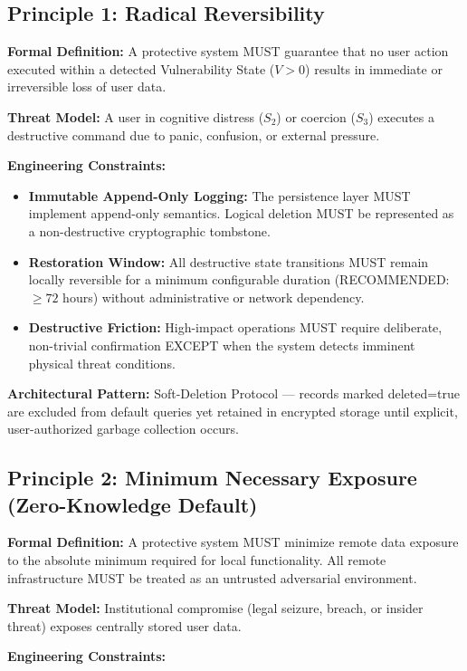\documentclass[acmsmall,review]{acmart}
\begin{document}
\subsection{Principle 1: Radical Reversibility}

\textbf{Formal Definition:} A protective system MUST guarantee that no user action executed within a detected Vulnerability State ($V > 0$) results in immediate or irreversible loss of user data.

\textbf{Threat Model:} A user in cognitive distress ($S_2$) or coercion ($S_3$) executes a destructive command due to panic, confusion, or external pressure.

\textbf{Engineering Constraints:}

\begin{itemize}
    \item \textbf{Immutable Append-Only Logging:} The persistence layer MUST implement append-only semantics. Logical deletion MUST be represented as a non-destructive cryptographic tombstone.
    \item \textbf{Restoration Window:} All destructive state transitions MUST remain locally reversible for a minimum configurable duration (RECOMMENDED: $\ge 72$ hours) without administrative or network dependency.
    \item \textbf{Destructive Friction:} High-impact operations MUST require deliberate, non-trivial confirmation EXCEPT when the system detects imminent physical threat conditions.
\end{itemize}

\textbf{Architectural Pattern:} Soft-Deletion Protocol --- records marked deleted=true are excluded from default queries yet retained in encrypted storage until explicit, user-authorized garbage collection occurs.

\subsection{Principle 2: Minimum Necessary Exposure (Zero-Knowledge Default)}

\textbf{Formal Definition:} A protective system MUST minimize remote data exposure to the absolute minimum required for local functionality. All remote infrastructure MUST be treated as an untrusted adversarial environment.

\textbf{Threat Model:} Institutional compromise (legal seizure, breach, or insider threat) exposes centrally stored user data.

\textbf{Engineering Constraints:}
\end{document}

